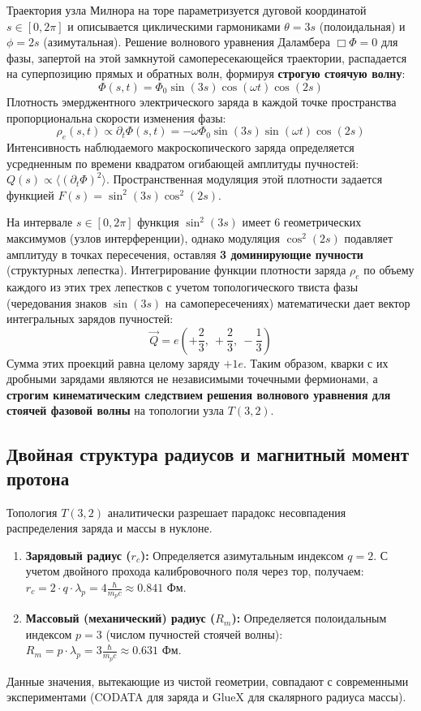\documentclass[12pt,a4paper]{article}
\begin{document}
	Траектория узла Милнора на торе параметризуется дуговой координатой $s \in [0, 2\pi]$ и описывается циклическими гармониками $\theta = 3s$ (полоидальная) и $\phi = 2s$ (азимутальная). Решение волнового уравнения Даламбера $\Box \Phi = 0$ для фазы, запертой на этой замкнутой самопересекающейся траектории, распадается на суперпозицию прямых и обратных волн, формируя \textbf{строгую стоячую волну}:
	\begin{equation}
		\Phi(s,t) = \Phi_0 \sin(3s) \cos(\omega t) \cos(2s)
	\end{equation}
	Плотность эмерджентного электрического заряда в каждой точке пространства пропорциональна скорости изменения фазы:
	\begin{equation}
		\rho_e(s,t) \propto \partial_t \Phi(s,t) = -\omega \Phi_0 \sin(3s) \sin(\omega t) \cos(2s)
	\end{equation}
	Интенсивность наблюдаемого макроскопического заряда определяется усредненным по времени квадратом огибающей амплитуды пучностей: $Q(s) \propto \langle (\partial_t \Phi)^2 \rangle$. Пространственная модуляция этой плотности задается функцией $F(s) = \sin^2(3s) \cos^2(2s)$.
	
	На интервале $s \in [0, 2\pi]$ функция $\sin^2(3s)$ имеет 6 геометрических максимумов (узлов интерференции), однако модуляция $\cos^2(2s)$ подавляет амплитуду в точках пересечения, оставляя \textbf{3 доминирующие пучности} (структурных лепестка). 
	Интегрирование функции плотности заряда $\rho_e$ по объему каждого из этих трех лепестков с учетом топологического твиста фазы (чередования знаков $\sin(3s)$ на самопересечениях) математически дает вектор интегральных зарядов пучностей:
	\begin{equation}
		\vec{Q} = e \left( +\frac{2}{3}, \ +\frac{2}{3}, \ -\frac{1}{3} \right)
	\end{equation}
	Сумма этих проекций равна целому заряду $+1e$. Таким образом, кварки с их дробными зарядами являются не независимыми точечными фермионами, а \textbf{строгим кинематическим следствием решения волнового уравнения для стоячей фазовой волны} на топологии узла $T(3,2)$.
	
	\subsection{Двойная структура радиусов и магнитный момент протона}
	Топология $T(3,2)$ аналитически разрешает парадокс несовпадения распределения заряда и массы в нуклоне.
	\begin{enumerate}
		\item \textbf{Зарядовый радиус ($r_c$):} Определяется азимутальным индексом $q=2$. С учетом двойного прохода калибровочного поля через тор, получаем: $r_c = 2 \cdot q \cdot \lambda_p = 4 \frac{\hbar}{m_p c} \approx \mathbf{0.841 \text{ Фм}}$.
		\item \textbf{Массовый (механический) радиус ($R_m$):} Определяется полоидальным индексом $p=3$ (числом пучностей стоячей волны): $R_m = p \cdot \lambda_p = 3 \frac{\hbar}{m_p c} \approx \mathbf{0.631 \text{ Фм}}$.
	\end{enumerate}
	Данные значения, вытекающие из чистой геометрии, совпадают с современными экспериментами (CODATA для заряда и GlueX для скалярного радиуса массы).
	
\end{document}
